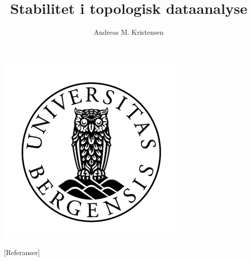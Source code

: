 \documentclass{article}
\title{Stabilitet i topologisk dataanalyse}
\author{Andreas M. Kristensen}
\newcommand{\inklsek}[1]{}
\begin{document}
\maketitle
\includegraphics{UiB_PositivEmblem.png}
\newpage
\tableofcontents
\inklsek{Introduksjon}
\inklsek{Forkunnskaper}
\inklsek{PersMod}
\inklsek{PersHom}
\inklsek{Alg_Stab}
[Referanser]
\end{document}
